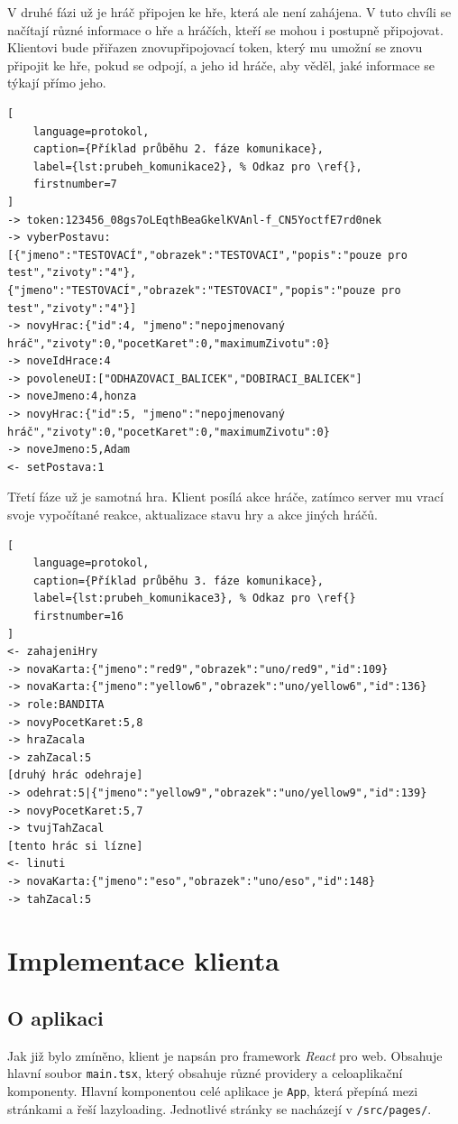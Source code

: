 V druhé fázi už je hráč připojen ke hře, která ale není zahájena. V tuto chvíli se načítají různé informace o hře a hráčích, kteří se mohou i postupně připojovat. Klientovi bude přiřazen znovupřipojovací token, který mu umožní se znovu připojit ke hře, pokud se odpojí, a jeho id hráče, aby věděl, jaké informace se týkají přímo jeho.
\begin{lstlisting}[
    language=protokol, 
    caption={Příklad průběhu 2. fáze komunikace}, 
    label={lst:prubeh_komunikace2}, % Odkaz pro \ref{},
    firstnumber=7
]
-> token:123456_08gs7oLEqthBeaGkelKVAnl-f_CN5YoctfE7rd0nek
-> vyberPostavu:[{"jmeno":"TESTOVACÍ","obrazek":"TESTOVACI","popis":"pouze pro test","zivoty":"4"},{"jmeno":"TESTOVACÍ","obrazek":"TESTOVACI","popis":"pouze pro test","zivoty":"4"}]
-> novyHrac:{"id":4, "jmeno":"nepojmenovaný hráč","zivoty":0,"pocetKaret":0,"maximumZivotu":0}
-> noveIdHrace:4
-> povoleneUI:["ODHAZOVACI_BALICEK","DOBIRACI_BALICEK"]
-> noveJmeno:4,honza
-> novyHrac:{"id":5, "jmeno":"nepojmenovaný hráč","zivoty":0,"pocetKaret":0,"maximumZivotu":0}
-> noveJmeno:5,Adam
<- setPostava:1
\end{lstlisting}

Třetí fáze už je samotná hra. Klient posílá akce hráče, zatímco server mu vrací svoje vypočítané reakce, aktualizace stavu hry a akce jiných hráčů.

\begin{lstlisting}[
    language=protokol, 
    caption={Příklad průběhu 3. fáze komunikace}, 
    label={lst:prubeh_komunikace3}, % Odkaz pro \ref{}
    firstnumber=16
]
<- zahajeniHry
-> novaKarta:{"jmeno":"red9","obrazek":"uno/red9","id":109}
-> novaKarta:{"jmeno":"yellow6","obrazek":"uno/yellow6","id":136}
-> role:BANDITA
-> novyPocetKaret:5,8
-> hraZacala
-> zahZacal:5
[druhý hrác odehraje]
-> odehrat:5|{"jmeno":"yellow9","obrazek":"uno/yellow9","id":139}
-> novyPocetKaret:5,7
-> tvujTahZacal
[tento hrác si lízne]
<- linuti
-> novaKarta:{"jmeno":"eso","obrazek":"uno/eso","id":148}
-> tahZacal:5
\end{lstlisting}





\section{Implementace klienta}
\subsection{O aplikaci}
Jak již bylo zmíněno, klient je napsán pro framework \emph{React} pro web. Obsahuje hlavní soubor \texttt{main.tsx}, který obsahuje různé providery a celoaplikační komponenty. Hlavní komponentou celé aplikace je \texttt{App}, která přepíná mezi stránkami a řeší lazyloading. Jednotlivé stránky se nacházejí v \texttt{/src/pages/}.

